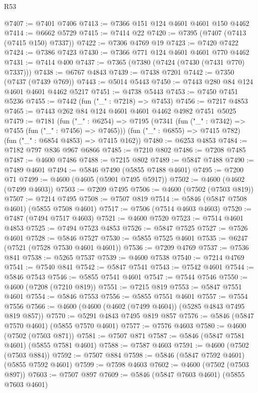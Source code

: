 \begin{lexlean}{R53}
\begin{coremodule}
@7407 := @7401 @7406
@7413 := @7366 @151 @124 @4601 @4601 @150 @4462
@7414 := @6662 @5729
@7415 := @7414 @22
@7420 := @7395 (@7407 (@7413 (@7415 @150) @7337))
@7422 := @7306 @4769 @19
@7423 := @7420 @7422
@7424 := @7386 @7423
@7430 := @7366 @771 @124 @4601 @4601 @770 @4462
@7431 := @7414 @400
@7437 := @7365 (@7380 (@7424 (@7430 (@7431 @770) @7337)))
@7438 := @6767 @4843
@7439 := @7438 @7201
@7442 := @7350 (@7437 (@7439 @769))
@7443 := @5014 @5443
@7450 := @7443 @280 @84 @124 @4601 @4601 @4462 @5217
@7451 := @4738 @5443
@7453 := @7450 @7451 @5236
@7455 := @7442 (fun ("_" : @7218) => @7453)
@7456 := @7217 @4853
@7465 := @7443 @262 @84 @124 @4601 @4601 @4462 @4982 @7451 @5025
@7479 := @7181
    (fun ("_" : @6254) =>
    @7195
      (@7341 (fun ("_" : @7342) => @7455 (fun ("_" : @7456) => @7465)))
      (fun ("_" : @6855) => @7415 @782)
      (fun ("_" : @6854 @4853) => @7415 @162))
@7480 := @6253 @4853
@7484 := @7182 @797 @836 @967 @6866
@7485 := @7210 @802
@7486 := @7208 @7485
@7487 := @4600 @7486
@7488 := @7215 @802
@7489 := @5847 @7488
@7490 := @7489 @4601
@7494 := @5846 @7490 (@5855 @7488 @4601)
@7495 := @7200 @71
@7499 := @4600 (@4605 (@5901 @7495 @5917))
@7502 := @4600 (@4602 (@7499 @4603))
@7503 := @7209 @7495
@7506 := @4600 (@7502 (@7503 @819))
@7507 := @7214 @7495
@7508 := @7507 @819
@7514 := @5846 (@5847 @7508 @4601) (@5855 @7508 @4601)
@7517 := @7506 (@7514 @4603 @4603)
@7520 := @7487 (@7494 @7517 @4603)
@7521 := @4600 @7520
@7523 := @7514 @4601 @4853
@7525 := @7494 @7523 @4853
@7526 := @5847 @7525
@7527 := @7526 @4601
@7528 := @5846 @7527
@7530 := @5855 @7525 @4601
@7535 := @6247 (@7521 (@7528 @7530 @4601 @4601))
@7536 := @7209 @4769
@7537 := @7536 @841
@7538 := @5265 @7537
@7539 := @4600 @7538
@7540 := @7214 @4769
@7541 := @7540 @841
@7542 := @5847 @7541
@7543 := @7542 @4601
@7544 := @5846 @7543
@7546 := @5855 @7541 @4601
@7547 := @7544 @7546
@7550 := @4600 (@7208 (@7210 @819))
@7551 := @7215 @819
@7553 := @5847 @7551 @4601
@7554 := @5846 @7553
@7556 := @5855 @7551 @4601
@7557 := @7554 @7556
@7566 := @4600 (@4600 (@4602 (@7499 @4604)) (@5285 @4843 @7495 @819 @857))
@7570 := @5291 @4843 @7495 @819 @857
@7576 := @5846 (@5847 @7570 @4601) (@5855 @7570 @4601)
@7577 := @7576 @4603
@7580 := @4600 (@7502 (@7503 @871))
@7581 := @7507 @871
@7587 := @5846 (@5847 @7581 @4601) (@5855 @7581 @4601)
@7588 := @7587 @4603
@7591 := @4600 (@7502 (@7503 @884))
@7592 := @7507 @884
@7598 := @5846 (@5847 @7592 @4601) (@5855 @7592 @4601)
@7599 := @7598 @4603
@7602 := @4600 (@7502 (@7503 @897))
@7603 := @7507 @897
@7609 := @5846 (@5847 @7603 @4601) (@5855 @7603 @4601)

\end{coremodule}
\end{lexlean}
